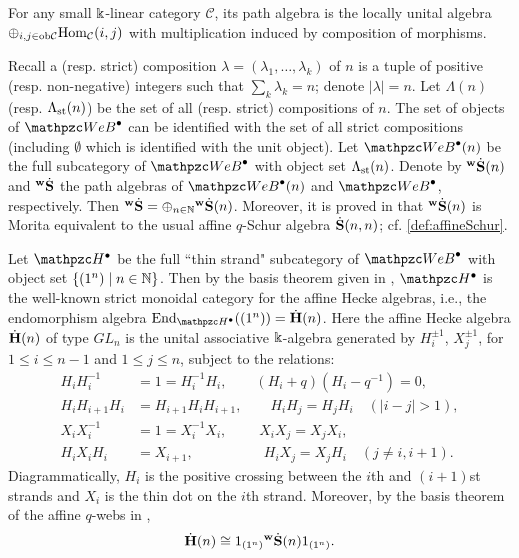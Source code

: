 For any small $\Bbbk$-linear category $\mathcal C$,  its path algebra is the locally unital algebra  $\oplus_{i,j\in \text{ob}\mathcal C}{\rm Hom}_{\mathcal C}(i,j)$ with multiplication induced by composition of morphisms. 

Recall a (resp. strict) composition $\lambda=(\lambda_1,\ldots,\lambda_k)$ of $n$ is a tuple of positive (resp. non-negative) integers such that $\sum_{k}\lambda_k=n$; denote $|\lambda|=n$. Let $\Lambda(n)$ (resp. $\Lambda_{\text{st}}(n)$) be the set of all (resp. strict) compositions of $n$.
The set of objects of $\qAW$ can be identified with the set of  all strict compositions (including $\emptyset$ which is identified with the unit object).   Let $\qAW(n) $ be the full subcategory 
of $\qAW$ with object set $\Lambda_{\text{st}}(n)$. Denote by  ${}^{\bold{w}}\dot{\bold{S}}(n)$ and ${}^{\bold{w}}\dot{\bold{S}}$ the path algebras of $\qAW(n) $ and $\qAW$, respectively. Then ${}^{\bold{w}}\dot{\bold{S}}=\oplus_{n\in \mathbb{N}}{}^{\bold{w}}\dot{\bold{S}}(n)$. 
Moreover, it is proved in \cite{SSW25} that ${}^{\bold{w}}\dot{\bold{S}}(n)$ is Morita equivalent to the usual affine $q$-Schur algebra $\dot{\bf S}(n,n)$; cf. \eqref{def:affineSchur}.

Let $\qAH$ be the full ``thin strand" subcategory of $\qAW$ with object set $\{(1^n)\mid n\in \mathbb{N}\}$. Then by the basis theorem given in \cite{SSW25}, $\qAH$ is the well-known strict monoidal category for the affine Hecke algebras, i.e., the endomorphism algebra $\End_{\qAH} ((1^n)) =\AHe(n)$. Here the affine Hecke algebra $\dot{\bf H}(n)$ of type $GL_n$  is the unital associative $\Bbbk$-algebra generated by $H_i^{\pm 1}$, $X_j^{\pm 1}$, for $1\le i\le n-1$ and $1\le j\le n$, subject to the relations:
\begin{align*}
    H_iH_i^{-1} &=1 =H_i^{-1}H_i, \qquad  (H_i+q)(H_i-q^{-1}) =0,
    \\
    H_iH_{i+1}H_i &=H_{i+1}H_iH_{i+1}, \qquad H_iH_j =H_jH_i \quad (|i-j|>1),
    \\
     X_iX_i^{-1} &=1 =X_i^{-1}X_i, \qquad\;  X_iX_j =X_jX_i,
    \\
    H_iX_iH_i &=X_{i+1}, \qquad\qquad\quad H_iX_j =X_jH_i  \quad (j\neq i,i+1).
\end{align*}
Diagrammatically, $H_i$ is the positive crossing between the $i$th and $(i+1)$st strands and $X_i$ is the thin dot on the $i$th strand. Moreover, by the basis theorem of the affine  $q$-webs in \cite{SSW25}, 
\begin{equation}
\label{equ:affwebhecke}
    \dot{\bf H}(n)\cong 1_{(1^n)} {}^{\bold{w}}\dot{\bold{S}}(n) 1_{(1^n)}.
\end{equation} 


